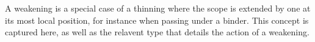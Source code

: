
A weakening is a special case of a thinning where the scope is extended by
one at its most local position, for instance when passing under a binder.
This concept is captured here, as well as the relavent type that details
the action of a weakening.

